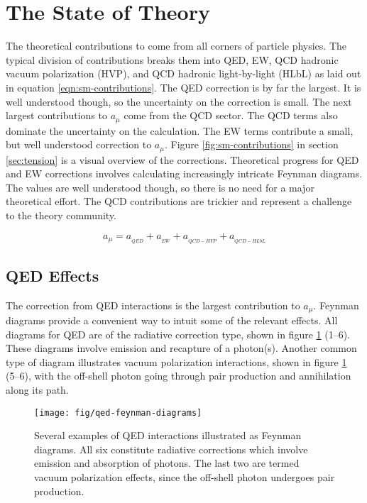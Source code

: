 \section{The State of Theory} \label{sec:theory}

The theoretical contributions to \mugmtwo come from all corners of particle physics.  The typical division of contributions breaks them into QED, EW, QCD hadronic vacuum polarization (HVP), and QCD hadronic light-by-light (HLbL) as laid out in equation \ref{eqn:sm-contributions}. The QED correction is by far the largest. It is well understood though, so the uncertainty on the correction is small.  The next largest contributions to $a_\mu$ come from the QCD sector.  The QCD terms also dominate the uncertainty on the calculation.  The EW terms contribute a small, but well understood correction to $a_\mu$.  Figure \ref{fig:sm-contributions} in section \ref{sec:tension} is a visual overview of the corrections.  Theoretical progress for QED and EW corrections involves calculating increasingly intricate Feynman diagrams. The values are well understood though, so there is no need for a major theoretical effort.  The QCD contributions are trickier and represent a challenge to the theory community.

\begin{equation}
\label{eqn:sm-contributions}
a_\mu = a_{_{QED}} + a_{_{EW}} + a_{_{QCD-HVP}} + a_{_{QCD-HLbL}}
\end{equation}

\subsection{QED Effects} \label{s-sec:theory-qed}

The correction from QED interactions is the largest contribution to $a_\mu$.  Feynman diagrams provide a convenient way to intuit some of the relevant effects.  All diagrams for QED are of the radiative correction type, shown in figure \ref{fig:qed-feynman-diagrams} (1\hbox{--}6).  These diagrams involve emission and recapture of a photon(s).  Another common type of diagram illustrates vacuum polarization interactions, shown in figure \ref{fig:qed-feynman-diagrams} (5\hbox{--}6), with the off-shell photon going through pair production and annihilation along its path.

\begin{figure}
\centering
\texttt{[image: fig/qed-feynman-diagrams]}
\caption{
    Several examples of QED interactions illustrated as Feynman diagrams.  All six constitute radiative corrections which involve emission and absorption of photons. The last two are termed vacuum polarization effects, since the off-shell photon undergoes pair production.
    \label{fig:qed-feynman-diagrams}
}
\end{figure}

